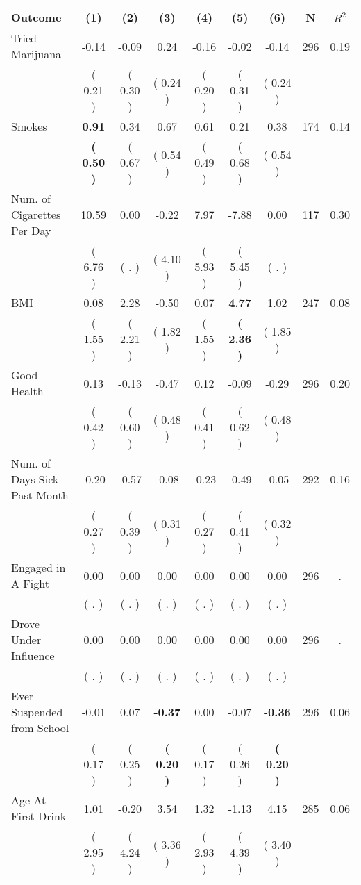 \begin{tabular}{lcccccccc}
\toprule
 \textbf{Outcome} & \textbf{(1)} & \textbf{(2)} & \textbf{(3)} & \textbf{(4)} & \textbf{(5)} & \textbf{(6)} & \textbf{N} & \textbf{$ R^2$} \\
\midrule
Tried Marijuana &     -0.14 &     -0.09 &      0.24 &     -0.16 &     -0.02 &     -0.14 & 296 &       0.19 \\ 
 & (     0.21 ) & (     0.30 ) & (     0.24 ) & (     0.20 ) & (     0.31 ) & (     0.24 ) & \\
Smokes & \textbf{     0.91} &      0.34 &      0.67 &      0.61 &      0.21 &      0.38 & 174 &       0.14 \\ 
 & \textbf{(     0.50 )} & (     0.67 ) & (     0.54 ) & (     0.49 ) & (     0.68 ) & (     0.54 ) & \\
Num. of Cigarettes Per Day &     10.59 &      0.00 &     -0.22 &      7.97 &     -7.88 &      0.00 & 117 &       0.30 \\ 
 & (     6.76 ) & (        . ) & (     4.10 ) & (     5.93 ) & (     5.45 ) & (        . ) & \\
BMI &      0.08 &      2.28 &     -0.50 &      0.07 & \textbf{     4.77} &      1.02 & 247 &       0.08 \\ 
 & (     1.55 ) & (     2.21 ) & (     1.82 ) & (     1.55 ) & \textbf{(     2.36 )} & (     1.85 ) & \\
Good Health &      0.13 &     -0.13 &     -0.47 &      0.12 &     -0.09 &     -0.29 & 296 &       0.20 \\ 
 & (     0.42 ) & (     0.60 ) & (     0.48 ) & (     0.41 ) & (     0.62 ) & (     0.48 ) & \\
Num. of Days Sick Past Month &     -0.20 &     -0.57 &     -0.08 &     -0.23 &     -0.49 &     -0.05 & 292 &       0.16 \\ 
 & (     0.27 ) & (     0.39 ) & (     0.31 ) & (     0.27 ) & (     0.41 ) & (     0.32 ) & \\
Engaged in A Fight &      0.00 &      0.00 &      0.00 &      0.00 &      0.00 &      0.00 & 296 &          . \\ 
 & (        . ) & (        . ) & (        . ) & (        . ) & (        . ) & (        . ) & \\
Drove Under Influence &      0.00 &      0.00 &      0.00 &      0.00 &      0.00 &      0.00 & 296 &          . \\ 
 & (        . ) & (        . ) & (        . ) & (        . ) & (        . ) & (        . ) & \\
Ever Suspended from School &     -0.01 &      0.07 & \textbf{    -0.37} &      0.00 &     -0.07 & \textbf{    -0.36} & 296 &       0.06 \\ 
 & (     0.17 ) & (     0.25 ) & \textbf{(     0.20 )} & (     0.17 ) & (     0.26 ) & \textbf{(     0.20 )} & \\
Age At First Drink &      1.01 &     -0.20 &      3.54 &      1.32 &     -1.13 &      4.15 & 285 &       0.06 \\ 
 & (     2.95 ) & (     4.24 ) & (     3.36 ) & (     2.93 ) & (     4.39 ) & (     3.40 ) & \\
\bottomrule
\end{tabular}
